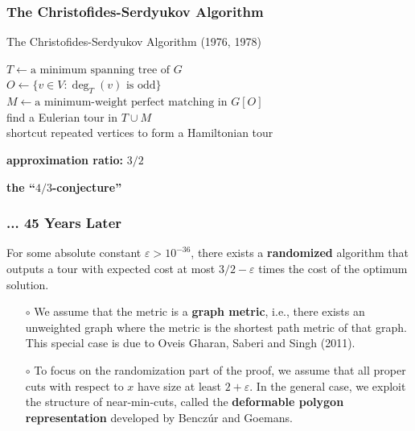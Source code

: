 \documentclass{beamer}
\begin{document}
  \begin{frame}
    \frametitle{The Christofides-Serdyukov Algorithm}
  
    \begin{block}{The Christofides-Serdyukov Algorithm (1976, 1978)}
      \begin{algorithm}[H]
        $T \leftarrow \text{a minimum spanning tree of $G$}$ \\
        $O \leftarrow \{ v \in V : \deg_T(v) \text{ is odd} \}$ \\
        $M \leftarrow \text{a minimum-weight perfect matching in $G[O]$}$ \\
        find a Eulerian tour in $T \cup M$ \\
        shortcut repeated vertices to form a Hamiltonian tour
      \end{algorithm}
    \end{block}

    \pause

    \bigskip

    {\bf approximation ratio: } $3/2$

    \pause

    \medskip

    {\bf the ``$4/3$-conjecture''}
  
  \end{frame}

  \begin{frame}
    \frametitle{... 45 Years Later}
  
    \pause

    \begin{theorem}
      For some absolute constant $\varepsilon > 10^{-36}$, there exists a {\bf randomized} algorithm that outputs a tour with expected cost at most $3/2 - \varepsilon$ times the cost of the optimum solution.
    \end{theorem}

    \pause

    \bigskip

    \begin{itemize}
      \item[$\circ$] We assume that the metric is a {\bf graph metric}, i.e., there exists an unweighted graph where the metric is the shortest path metric of that graph. This special case is due to Oveis Gharan, Saberi and Singh (2011). \pause
      \item[$\circ$] To focus on the randomization part of the proof, we assume that all proper cuts with respect to $x$ have size at least $2 + \varepsilon$. In the general case, we exploit the structure of near-min-cuts, called the {\bf deformable polygon representation} developed by Bencz\'ur and Goemans.
    \end{itemize}
  
  \end{frame}
\end{document}
